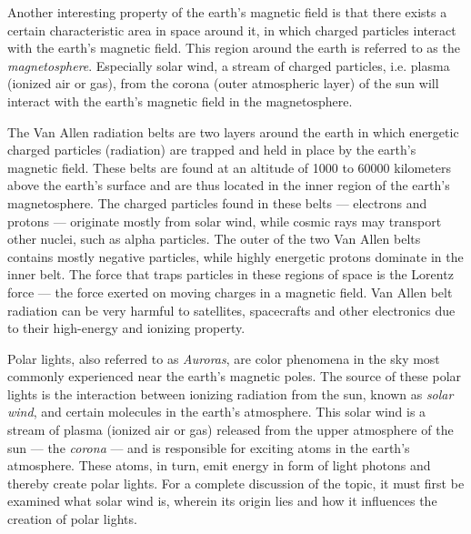 Another interesting property of the earth's magnetic field is that there exists a certain characteristic area in space around it, in which charged particles interact with the earth's magnetic field. This region around the earth is referred to as the \emph{magnetosphere}. Especially solar wind, a stream of charged particles, i.e. plasma (ionized air or gas), from the corona (outer atmospheric layer) of the sun will interact with the earth's magnetic field in the magnetosphere.


The Van Allen radiation belts are two layers around the earth in which energetic charged particles (radiation) are trapped and held in place by the earth's magnetic field. These belts are found at an altitude of 1000 to 60000 kilometers above the earth's surface and are thus located in the inner region of the earth's magnetosphere. The charged particles found in these belts --- electrons and protons --- originate mostly from solar wind, while cosmic rays may transport other nuclei, such as alpha particles. The outer of the two Van Allen belts contains mostly negative particles, while highly energetic protons dominate in the inner belt. The force that traps particles in these regions of space is the Lorentz force --- the force exerted on moving charges in a magnetic field. Van Allen belt radiation can be very harmful to satellites, spacecrafts and other electronics due to their high-energy and ionizing property.


Polar lights, also referred to as \emph{Auroras}, are color phenomena in the sky most commonly experienced near the earth's magnetic poles. The source of these polar lights is the interaction between ionizing radiation from the sun, known as \emph{solar wind}, and certain molecules in the earth's atmosphere. This solar wind is a stream of plasma (ionized air or gas) released from the upper atmosphere of the sun --- the \emph{corona} --- and is responsible for exciting atoms in the earth's atmosphere. These atoms, in turn, emit energy in form of light photons and thereby create polar lights. For a complete discussion of the topic, it must first be examined what solar wind is, wherein its origin lies and how it influences the creation of polar lights.


